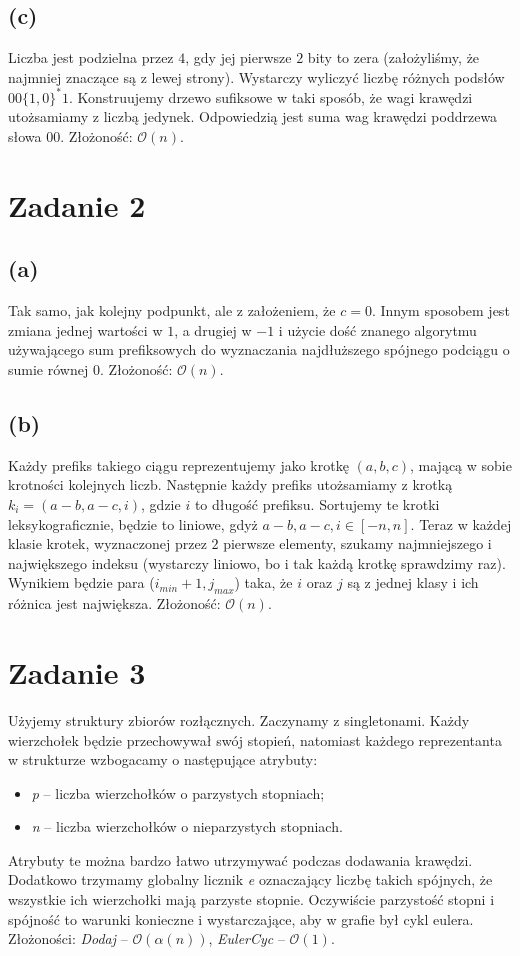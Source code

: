 \documentclass[12pt, a4paper]{article}
\newcommand{\MCALO}{\mathcal{O}}
\begin{document}
\subsection*{(c)}
Liczba jest podzielna przez $4$, gdy jej pierwsze $2$ bity to zera
(założyliśmy, że najmniej znaczące są z lewej strony). Wystarczy wyliczyć
liczbę różnych podsłów $00\{1,0\}^*1$. Konstruujemy drzewo sufiksowe w taki
sposób, że wagi krawędzi utożsamiamy z liczbą jedynek. Odpowiedzią jest suma
wag krawędzi poddrzewa słowa $00$.
Złożoność: $\MCALO(n)$.

\section*{Zadanie 2}
\subsection*{(a)}
Tak samo, jak kolejny podpunkt, ale z założeniem, że $c=0$.
Innym sposobem jest zmiana jednej wartości w $1$, a drugiej w $-1$ i użycie
dość znanego algorytmu używającego sum prefiksowych do wyznaczania najdłuższego
spójnego podciągu o sumie równej $0$.
Złożoność: $\MCALO(n)$.

\subsection*{(b)}
Każdy prefiks takiego ciągu reprezentujemy jako krotkę $(a, b, c)$, mającą
w sobie krotności kolejnych liczb. Następnie każdy prefiks utożsamiamy z krotką
$k_i = (a-b, a-c, i)$, gdzie $i$ to długość prefiksu. Sortujemy te krotki
leksykograficznie, będzie to liniowe, gdyż $a-b, a-c, i \in [-n, n]$. Teraz
w każdej klasie krotek, wyznaczonej przez $2$ pierwsze elementy, szukamy
najmniejszego i największego indeksu (wystarczy liniowo, bo i tak każdą krotkę
sprawdzimy raz). Wynikiem będzie para ($i_{min} + 1, j_{max}$) taka, że $i$ oraz
$j$ są z jednej klasy i ich różnica jest największa.
Złożoność: $\MCALO(n)$.

\section*{Zadanie 3}
Użyjemy struktury zbiorów rozłącznych. Zaczynamy z singletonami. Każdy
wierzchołek będzie przechowywał swój stopień, natomiast każdego reprezentanta
w strukturze wzbogacamy o następujące atrybuty:
\begin{itemize}
  \item \textit{p} -- liczba wierzchołków o parzystych stopniach;
  \item \textit{n} -- liczba wierzchołków o nieparzystych stopniach.
\end{itemize}
Atrybuty te można bardzo łatwo utrzymywać podczas dodawania krawędzi. Dodatkowo
trzymamy globalny licznik \textit{e} oznaczający liczbę takich spójnych, że
wszystkie ich wierzchołki mają parzyste stopnie. Oczywiście parzystość stopni
i spójność to warunki konieczne i wystarczające, aby w grafie był cykl eulera.
Złożoności:
\textit{Dodaj} -- $\MCALO(\alpha(n))$,
\textit{EulerCyc} -- $\MCALO(1)$.
\end{document}

